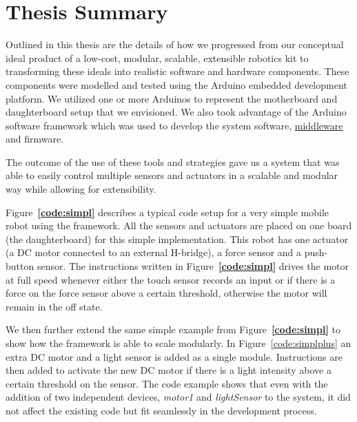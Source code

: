 \section{Thesis Summary}
Outlined in this thesis are the details of how we progressed from our conceptual ideal product of a low-cost, modular, scalable, extensible robotics kit to transforming these ideals into realistic software and hardware components. These components were modelled and tested using the Arduino embedded development platform. We utilized one or more Arduinos to represent the motherboard and daughterboard setup that we envisioned. We also took advantage of the Arduino software framework which was used to develop the system software, \hyperref[ssub:middleware]{middleware} and firmware.

The outcome of the use of these tools and strategies gave us a system that was able to easily control multiple sensors and actuators in a scalable and modular way while allowing for extensibility.

Figure~\textbf{\ref{code:simpl}} describes a typical code setup for a very simple mobile robot using the \xten framework. All the sensors and actuators are placed on one board (the daughterboard) for this simple implementation. This robot has one actuator (a DC motor connected to an external H-bridge), a force sensor and a push-button sensor. The instructions written in Figure~\textbf{\ref{code:simpl}} drives the motor at full speed whenever either the touch sensor records an input or if there is a force on the force sensor above a certain threshold, otherwise the motor will remain in the off state.

 We then further extend the same simple example from Figure~\textbf{\ref{code:simpl}} to show how the \xten framework is able to scale modularly.
 In Figure~\ref{code:simplplus} an extra DC motor and a light sensor is added as a single module. Instructions are then added to activate the new DC motor if there is a light intensity above a certain threshold on the sensor. The code example shows that even with the addition of two independent devices, \emph{motor1} and \emph{lightSensor} to the system, it did not affect the existing code but fit seamlessly in the development process.
 

